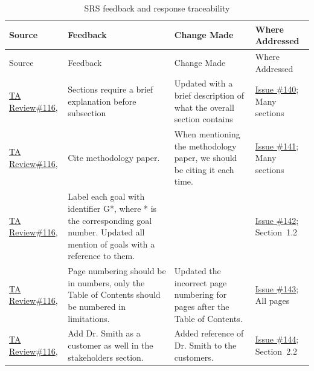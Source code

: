 \documentclass{article}
\begin{document}
    \begin{longtable}{p{} p{}
                    p{} p{}}
    \caption{SRS feedback and response traceability}
    \label{tab:srs-trace}\\
    \toprule
    Source & Feedback & Change Made & Where Addressed \\
    \midrule
    \endfirsthead

    \toprule
    Source & Feedback & Change Made & Where Addressed \\
    \midrule
    \endhead

    \bottomrule
    \endfoot

    \href{https://github.com/thaafei/DomainX/issues/116}{TA Review\#116},
    &
    Sections require a brief explanation before subsection
    &
    Updated with a brief description of what the overall section contains
    &
    \href{https://github.com/thaafei/DomainX/issues/140}{Issue \#140}; Many sections
    \\

    \href{https://github.com/thaafei/DomainX/issues/116}{TA Review\#116},
    &
    Cite methodology paper.
    &
    When mentioning the methodology paper, we should be citing it each time.
    &
    \href{https://github.com/thaafei/DomainX/issues/141}{Issue \#141}; Many sections
    \\

    \href{https://github.com/thaafei/DomainX/issues/116}{TA Review\#116},
    &
    Label each goal with identifier G*, where * is the corresponding goal number. Updated all mention of goals with a reference to them.
    &
    &
    \href{https://github.com/thaafei/DomainX/issues/142}{Issue \#142}; Section~1.2
    \\

    \href{https://github.com/thaafei/DomainX/issues/116}{TA Review\#116},
    &
    Page numbering should be in numbers, only the Table of Contents should be numbered in limitations.
    &
    Updated the incorrect page numbering for pages after the Table of Contents.
    &
    \href{https://github.com/thaafei/DomainX/issues/143}{Issue \#143}; All pages
    \\

    \href{https://github.com/thaafei/DomainX/issues/116}{TA Review\#116},
    &
    Add Dr. Smith as a customer as well in the stakeholders section.
    &
    Added reference of Dr. Smith to the customers.
    &
    \href{https://github.com/thaafei/DomainX/issues/144}{Issue \#144}; Section~2.2
    \\


\end{longtable}
\end{document}

